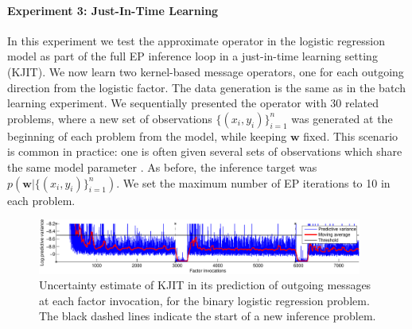 \documentclass[english]{article}
\theoremstyle{plain}
\theoremstyle{plain}
\newcommand{\wjnote}[1]{ }
\begin{document}

\paragraph{Experiment 3: Just-In-Time Learning}
In this experiment we test the approximate operator in the logistic regression model as part of the full EP inference loop in a just-in-time learning setting (KJIT). %
We now learn two kernel-based message operators, one for each outgoing 
direction from the logistic factor. 
The data generation is the same as in the batch learning experiment.
We sequentially presented the operator with 30 related problems, where a new 
set of observations $\{(x_i, y_i)\}_{i=1}^n$ was generated at the beginning of 
each problem from the model, while keeping $\boldsymbol{w}$ fixed.
This scenario is common in practice: one is often given several sets of 
observations which share the same model parameter \citep{Eslami2014}. 
As before, the inference target was $p(\boldsymbol{w}|\{(x_i, y_i)\}_{i=1}^n)$.
We set the maximum number of EP iterations to 10 in each problem.

\begin{figure}[t]
\centering
\includegraphics[width=0.95\textwidth]{img/online/logistic_temporal_uncertainty-crop}
\caption{Uncertainty estimate of KJIT in its prediction of outgoing messages at each factor invocation,
for the binary logistic regression problem. The black dashed lines indicate the start 
of a new inference problem.
\label{fig:logistic_temporal_uncertainty}
}
\end{figure}

\end{document}

